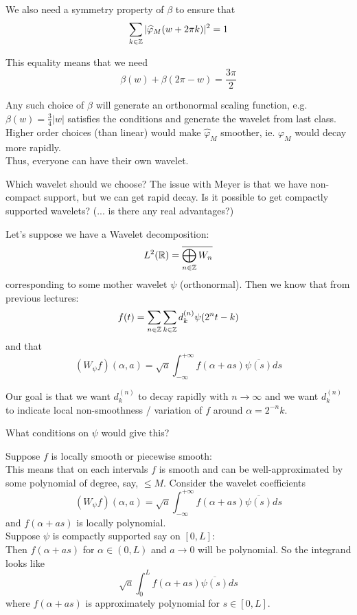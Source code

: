 \documentclass{article}
\begin{document}
{We also need a symmetry property of $\beta$ to ensure that
\[\sum_{k \in \mathbb{Z}} |\widehat{\varphi}_M(w + 2\pi k)|^2 = 1\]

This equality means that we need
\[\beta(w) + \beta(2\pi - w) = \frac{3\pi}{2}\]

Any such choice of $\beta$ will generate an orthonormal scaling function, e.g. $\beta(w) = \frac{3}{4}|w|$ satisfies the conditions and generate the wavelet from last class.\\

Higher order choices (than linear) would make $\widehat{\varphi}_M$ smoother, ie. $\varphi_M$ would decay more rapidly.\\

Thus, everyone can have their own wavelet.

\begin{question}
    Which wavelet should we choose? The issue with Meyer is that we have non-compact support, but we can get rapid decay. Is it possible to get compactly supported wavelets? (... is there any real advantages?)
\end{question}

Let's suppose we have a Wavelet decomposition:
\[L^2(\mathbb{R}) = \overline{\bigoplus_{n \in \mathbb{Z}} W_n}\]
corresponding to some mother wavelet $\psi$ (orthonormal). Then we know that from previous lectures:
\[f(t) = \sum_{n \in \mathbb{Z}} \sum_{k \in \mathbb{Z}} d_k^{(n)} \psi(2^n t - k)\]
and that
\[(W_\psi f)(\alpha, a) = \sqrt{a} \int_{-\infty}^{+\infty} f(\alpha + as) \overline{\psi(s)} ds \]

Our goal is that we want $d_k^{(n)}$ to decay rapidly with $n \to \infty$ and we want $d_k^{(n)}$ to indicate local non-smoothness / variation of $f$ around $\alpha = 2^{-n} k$.\\

\begin{question}
What conditions on $\psi$ would give this?    
\end{question}

Suppose $f$ is locally smooth or piecewise smooth:
\[\]
This means that on each intervals $f$ is smooth and can be well-approximated by some polynomial of degree, say, $\leq M$. Consider the wavelet coefficients
\[(W_\psi f)(\alpha, a) = \sqrt{a} \int_{-\infty}^{+\infty} f(\alpha + as) \overline{\psi(s)} ds\]
and $f(\alpha + as)$ is locally polynomial.\\

Suppose $\psi$ is compactly supported say on $[0, L]$:
\[\]
Then $f(\alpha + as)$ for $\alpha \in (0, L)$ and $a \to 0$ will be polynomial. So the integrand looks like
\[\sqrt{a} \int_0^L f(\alpha + as) \overline{\psi(s)} ds\]
where $f(\alpha + as)$ is approximately polynomial for $s \in [0, L]$.\\

}
\end{document}
